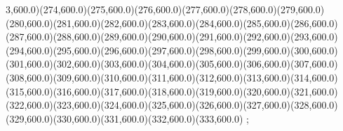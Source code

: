 {3,600.0)(274,600.0)(275,600.0)(276,600.0)(277,600.0)(278,600.0)(279,600.0)(280,600.0)(281,600.0)(282,600.0)(283,600.0)(284,600.0)(285,600.0)(286,600.0)(287,600.0)(288,600.0)(289,600.0)(290,600.0)(291,600.0)(292,600.0)(293,600.0)(294,600.0)(295,600.0)(296,600.0)(297,600.0)(298,600.0)(299,600.0)(300,600.0)(301,600.0)(302,600.0)(303,600.0)(304,600.0)(305,600.0)(306,600.0)(307,600.0)(308,600.0)(309,600.0)(310,600.0)(311,600.0)(312,600.0)(313,600.0)(314,600.0)(315,600.0)(316,600.0)(317,600.0)(318,600.0)(319,600.0)(320,600.0)(321,600.0)(322,600.0)(323,600.0)(324,600.0)(325,600.0)(326,600.0)(327,600.0)(328,600.0)(329,600.0)(330,600.0)(331,600.0)(332,600.0)(333,600.0)
};
